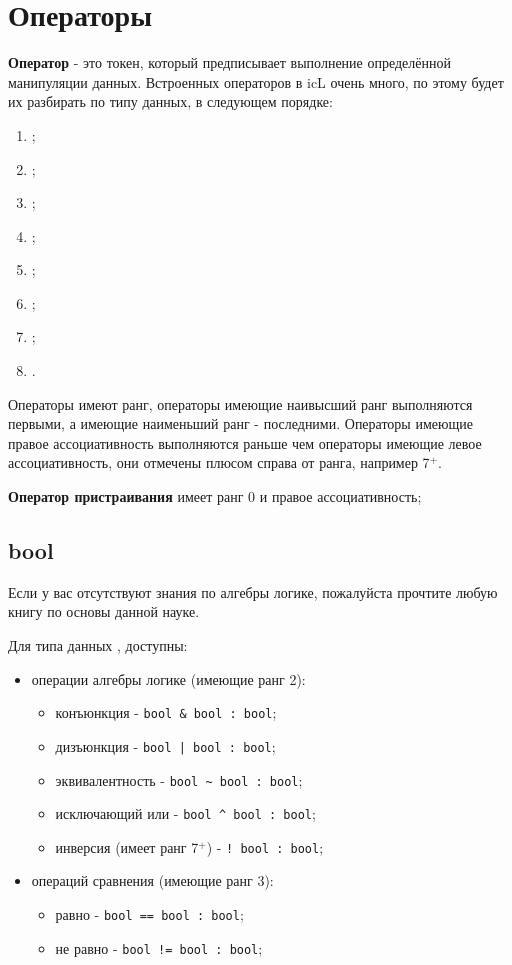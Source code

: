 \documentclass[a4paper, 14pt]{extarticle}
\newenvironment{icItems}
	{ \begin{itemize} [noitemsep,nolistsep] }
	{ \end{itemize} }
\newenvironment{icEnum}
	{ \begin{enumerate}[noitemsep,nolistsep] }
	{ \end{enumerate} }
\begin{document}
\newpage
\section{Операторы}

	{\bf Оператор} - это токен, который предписывает выполнение определённой манипуляции данных. Встроенных операторов в icL очень много, по этому будет их разбирать по типу данных, в следующем порядке:
\begin{icEnum}
	\item {};
	\item {};
	\item {};
	\item {};
	\item {};
	\item {};
	\item {};
	\item {}.
\end{icEnum}

	Операторы имеют ранг, операторы имеющие наивысший ранг выполняются первыми, а имеющие наименьший ранг - последними. Операторы имеющие правое ассоциативность выполняются раньше чем операторы имеющие левое ассоциативность, они отмечены плюсом справа от ранга, например 7$^+$.
	
	{\bf Оператор пристраивания} имеет ранг 0 и правое ассоциативность;

\subsection{\color{bluemarin}bool}

	Если у вас отсутствуют знания по алгебры логике, пожалуйста прочтите любую книгу по основы данной науке.

	Для типа данных , доступны:
\begin{icItems}
	\item операции алгебры логике (имеющие ранг 2):
	\begin{icItems}
		\item конъюнкция - \lstinline`bool & bool : bool`;
		\item дизъюнкция - \lstinline`bool | bool : bool`;
		\item эквивалентность - \lstinline`bool ~ bool : bool`;
		\item исключающий или - \lstinline`bool ^ bool : bool`;
		\item инверсия (имеет ранг 7$^+$) - \lstinline`! bool : bool`;
	\end{icItems}

	\item операций сравнения (имеющие ранг 3):
	\begin{icItems}
		\item равно - \lstinline`bool == bool : bool`;
		\item не равно - \lstinline`bool != bool : bool`;
	\end{icItems}
\end{icItems}
\end{document}
